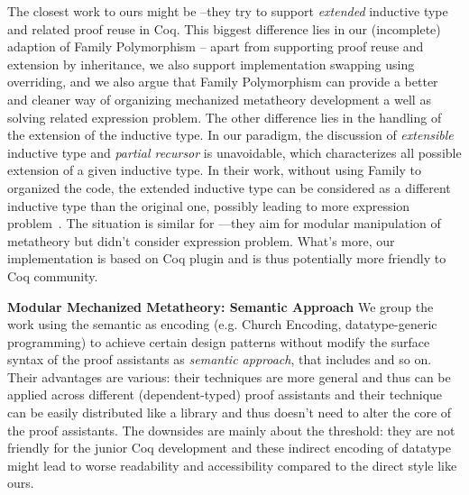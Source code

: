 The closest work to ours might be \citet{boite2004proof}--they try to support \textit{extended} inductive type and related proof reuse in Coq. This biggest difference lies in our (incomplete) adaption of Family Polymorphism -- apart from supporting proof reuse and extension by inheritance, we also support implementation swapping using overriding, and we also argue that Family Polymorphism can provide a better and cleaner way of organizing mechanized metatheory development a well as solving related expression problem. The other difference lies in the handling of the extension of the inductive type. In our paradigm, the discussion of \textit{extensible} inductive type and \textit{partial recursor} is unavoidable, which characterizes all possible extension of a given inductive type. In their work, without using Family to organized the code, the extended inductive type can be considered as a different inductive type than the original one, possibly leading to more expression problem~\cite{wadler-ep}. The situation is similar for \citet{levin2003tinkertype}---they aim for modular manipulation of metatheory but didn't consider expression problem.  What's more, our implementation is based on Coq plugin and is thus potentially more friendly to Coq community.


\textbf{Modular Mechanized Metatheory: Semantic Approach} We group the work using the semantic as encoding (e.g. Church Encoding, datatype-generic programming) to achieve certain design patterns without modify the surface syntax of the proof assistants as \textit{semantic approach}, that includes \citet{delaware2013,forsta2020,liwei2022,schwaab2013modular, keuchel2013generic} and so on. Their advantages are various: their techniques are more general and thus can be applied across different (dependent-typed) proof assistants and their technique can be easily distributed like a library and thus doesn't need to alter the core of the proof assistants. The downsides are mainly about the threshold: they are not friendly for the junior Coq development and these indirect encoding of datatype might lead to worse readability and accessibility compared to the direct style like ours.

\fi